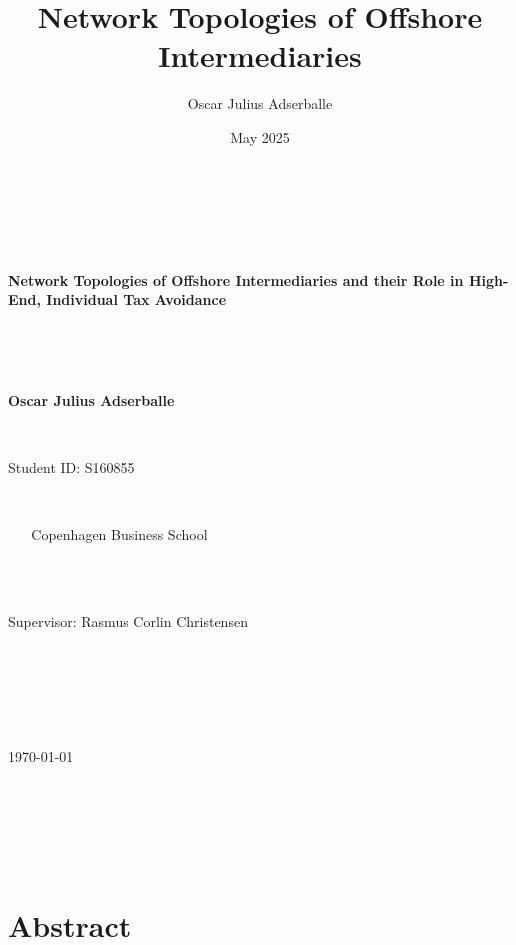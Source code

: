 \documentclass[12pt, a4paper]{report}
\title{Network Topologies of Offshore Intermediaries}
\author{Oscar Julius Adserballe} %
\date{May 2025} %
\begin{document}
\begin{titlepage}
    \centering
    \vspace*{1cm} 

    {\Huge\bfseries Network Topologies of Offshore Intermediaries and their Role in High-End, Individual Tax Avoidance\par}

    \vspace{1.5cm}

    {\Large\bfseries Oscar Julius Adserballe\par} %
    {\large Student ID: S160855\par} %

    \vspace{1cm}

    {\large Copenhagen Business School} \\ %

    \vspace{2cm}

    {\large Supervisor: Rasmus Corlin Christensen\par} 

    \vspace{1.5cm}

    {\large \today\par} 

    \vfill 
\end{titlepage}

\pagestyle{plain} %

\newpage
\tableofcontents %

\newpage
\listoffigures %

\newpage
\listoftables  %

\newpage

\chapter*{Abstract}
\label{sec:abstract}
\end{document}
